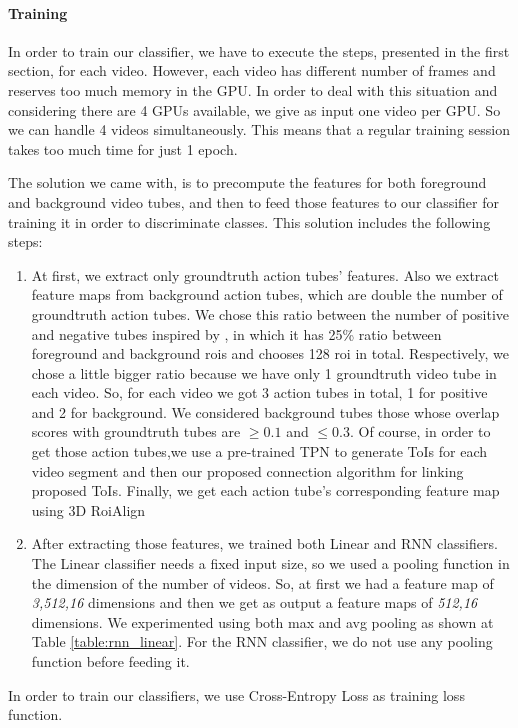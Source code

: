 \paragraph{Training}
In order to train our classifier, we have to execute the steps, presented in the first section, for each video. However, each video
has different number of frames and reserves too much memory in the GPU. In order to deal with this situation and considering there are
4 GPUs available,
we give as input one video per GPU. So we can handle 4 videos simultaneously. This means that a regular
training session takes too much time for just 1 epoch. \par
The solution we came with, is to precompute the features for both foreground  and background video tubes, and 
then to feed those features to our classifier for training  it in order to discriminate classes. This solution includes the following steps:
\begin{enumerate}
\item  At first, we extract only groundtruth action tubes’ features. Also we extract feature maps from  background action tubes, which
  are double the number of groundtruth action tubes. We chose this
ratio between the number of  positive and negative tubes inspired by \cite{jjfaster2rcnn}, in which it has 25\% ratio between foreground
and background rois and chooses 128 roi in total. Respectively, we chose a little bigger ratio because we have only 1 groundtruth
video tube in each video. So, for each video we got 3 action  tubes in total, 1 for positive and 2 for background. We considered
background tubes those whose overlap scores with groundtruth tubes are $ \ge 0.1 $ and $ \le 0.3 $. Of course, 
in order to get those action tubes,we use a pre-trained TPN to generate ToIs for each video segment and then our proposed connection
algorithm for linking proposed ToIs. Finally, we get each action tube's corresponding feature map using 3D RoiAlign

\item After extracting those features, we trained both Linear and RNN classifiers. The Linear classifier needs a fixed input size, so
  we used a pooling function in the dimension of the number of videos. So, at first we had a feature map of \textit{3,512,16} dimensions and then
  we get as output a feature maps of \textit{512,16} dimensions. We experimented using  both max and avg pooling as shown at Table \ref{table:rnn_linear}.
  For the RNN classifier, we do not use any pooling function before feeding it.
\end{enumerate}
In order to train our classifiers, we use Cross-Entropy Loss as training loss function.
